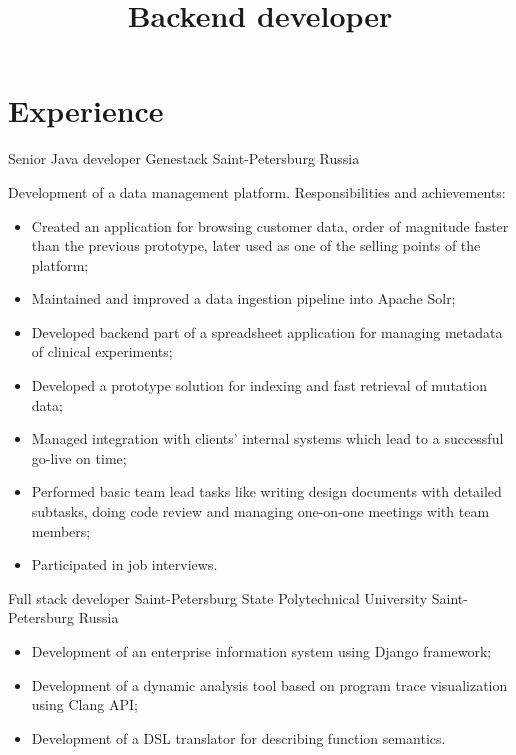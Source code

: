 \documentclass{moderncv}
\title{Backend developer}
\begin{document}
\makecvtitle

\section{Experience}

        {Senior Java developer}
        {Genestack}
        {Saint-Petersburg}
        {Russia}
        {Development of a data management platform. \newline{} Responsibilities and achievements:
        \begin{itemize}
            \item Created an application for browsing customer data, order of magnitude faster than the previous prototype, later
            used as one of the selling points of the platform;
            \item Maintained and improved a data ingestion pipeline into Apache Solr;
            \item Developed backend part of a spreadsheet application for managing metadata of clinical experiments;
            \item Developed a prototype solution for indexing and fast retrieval of mutation data;
            \item Managed integration with clients' internal systems which lead to a successful go-live on time;
            \item Performed basic team lead tasks like writing design documents with detailed subtasks, doing code review 
            and managing one-on-one meetings with team members;   
            \item Participated in job interviews.
        \end{itemize}}

        {Full stack developer}
        {Saint-Petersburg State Polytechnical University}
        {Saint-Petersburg}
        {Russia}
        {\begin{itemize}
            \item Development of an enterprise information system using Django framework;
            \item Development of a dynamic analysis tool based on program trace visualization using Clang API;
            \item Development of a DSL translator for describing function semantics.
        \end{itemize}}

\end{document}
